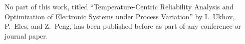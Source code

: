 No part of this work, titled ``Temperature-Centric Reliability Analysis and
Optimization of Electronic Systems under Process Variation'' by I.~Ukhov,
P.~Eles, and Z.~Peng, has been published before as part of any conference or
journal paper.
